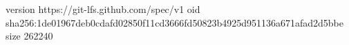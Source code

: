 version https://git-lfs.github.com/spec/v1
oid sha256:1de01967deb0cdafd02850f11cd3666fd50823b4925d951136a671afad2d5bbe
size 262240
